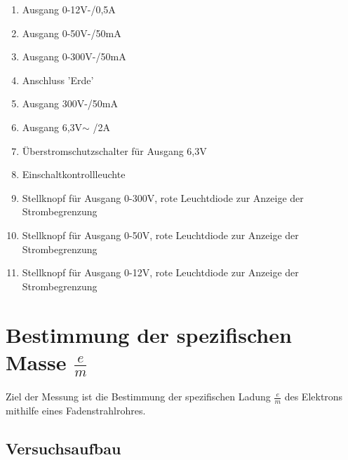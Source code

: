 \documentclass[12pt,a4paper]{article}
\begin{document}
\begin{enumerate}
\item	Ausgang 0-12V-/0,5A

\item	Ausgang 0-50V-/50mA

\item	Ausgang 0-300V-/50mA

\item	Anschluss 'Erde'

\item	Ausgang 300V-/50mA

\item	Ausgang 6,3V$\sim$   /2A

\item	Überstromschutzschalter für Ausgang 6,3V

\item	Einschaltkontrollleuchte

\item	Stellknopf für Ausgang 0-300V, rote Leuchtdiode zur Anzeige der Strombegrenzung

\item	Stellknopf für Ausgang 0-50V, rote Leuchtdiode zur Anzeige der Strombegrenzung

\item	Stellknopf für Ausgang 0-12V, rote Leuchtdiode zur Anzeige der Strombegrenzung
\end{enumerate}
\newpage
\section{Bestimmung der spezifischen Masse $\frac{e}{m}$}
Ziel der Messung ist die Bestimmung der spezifischen Ladung $\frac{e}{m}$ des Elektrons mithilfe eines Fadenstrahlrohres.

\subsection{Versuchsaufbau}
\end{document}
